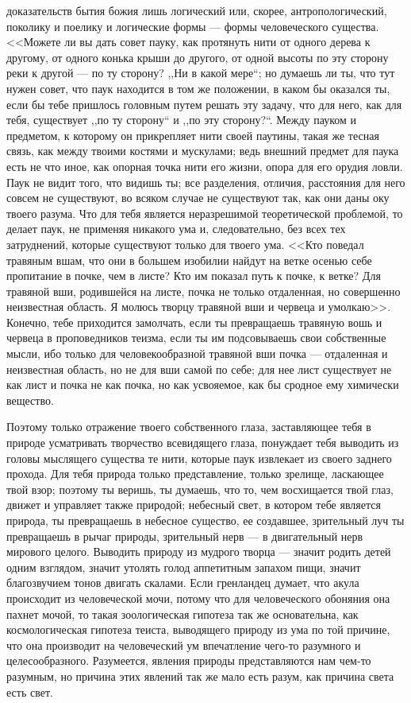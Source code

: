 \documentclass[12pt,oneside]{book}
\begin{document}
доказательств бытия божия лишь логический или, скорее, антропологический, поколику и поелику и логические формы --- формы человеческого существа. <<Можете ли вы дать совет пауку, как протянуть нити от одного дерева к другому, от одного конька крыши до другого, от одной высоты по эту сторону реки к другой --- по ту сторону? ,,Ни в какой мере``; но думаешь ли ты, что тут нужен совет, что паук находится в том же положении, в каком бы оказался ты, если бы тебе пришлось головным путем решать эту задачу, что для него, как для тебя, существует ,,по ту сторону`` и ,,по эту сторону?``. Между пауком и предметом, к которому он прикрепляет нити своей паутины, такая же тесная связь, как между твоими костями и мускулами; ведь внешний предмет для паука есть не что иное, как опорная точка нити его жизни, опора для его орудия ловли. Паук не видит того, что видишь ты; все разделения, отличия, расстояния для него совсем не существуют, во всяком случае не существуют так, как они даны оку твоего разума. Что для тебя является неразрешимой теоретической проблемой, то делает паук, не применяя никакого ума и, следовательно, без всех тех затруднений, которые существуют только для твоего ума. <<Кто поведал травяным вшам, что они в большем изобилии найдут на ветке осенью себе пропитание в почке, чем в листе? Кто им показал путь к почке, к ветке? Для травяной вши, родившейся на листе, почка не только отдаленная, но совершенно неизвестная область. Я молюсь творцу травяной вши и червеца и умолкаю>>. Конечно, тебе приходится замолчать, если ты превращаешь травяную вошь и червеца в проповедников теизма, если ты им подсовываешь свои собственные мысли, ибо только для человекообразной травяной вши почка --- отдаленная и неизвестная область, но не для вши самой по себе; для нее лист существует не как лист и почка не как почка, но как усвояемое, как бы сродное ему химически вещество.

Поэтому только отражение твоего собственного глаза, заставляющее тебя в природе усматривать творчество всевидящего глаза, понуждает тебя выводить из головы мыслящего существа те нити, которые паук извлекает из своего заднего прохода. Для тебя природа только представление, только зрелище, ласкающее твой взор; поэтому ты веришь, ты думаешь, что то, чем восхищается твой глаз, движет и управляет также природой; небесный свет, в котором тебе является природа, ты превращаешь в небесное существо, ее создавшее, зрительный луч ты превращаешь в рычаг природы, зрительный нерв --- в двигательный нерв мирового целого. Выводить природу из мудрого творца --- значит родить детей одним взглядом, значит утолять голод аппетитным запахом пищи, значит благозвучием тонов двигать скалами. Если гренландец думает, что акула происходит из человеческой мочи, потому что для человеческого обоняния она пахнет мочой, то такая зоологическая гипотеза так же основательна, как космологическая гипотеза теиста, выводящего природу из ума по той причине, что она производит на человеческий ум впечатление чего-то разумного и целесообразного. Разумеется, явления природы представляются нам чем-то разумным, но причина этих явлений так же мало есть разум, как причина света есть свет.
\end{document}
